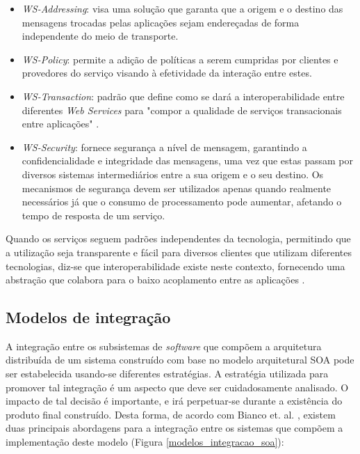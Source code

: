 \begin{itemize}
\item \textit{WS-Addressing}: visa uma solução que garanta que a origem e o destino das mensagens trocadas pelas aplicações sejam endereçadas de forma independente do meio de transporte.
\item \textit{WS-Policy}: permite a adição de políticas a serem cumpridas por clientes e provedores do serviço visando à efetividade da interação entre estes.
\item \textit{WS-Transaction}: padrão que define como se dará a interoperabilidade entre diferentes \textit{Web Services} para "compor a qualidade de serviços transacionais entre aplicações" \cite{oliveira_interoperabilidade}.
\item \textit{WS-Security}: fornece segurança a nível de mensagem, garantindo a confidencialidade e integridade das mensagens, uma vez que estas passam por diversos sistemas intermediários entre a sua origem e o seu destino. Os mecanismos de segurança devem ser utilizados apenas quando realmente necessários já que o consumo de processamento pode aumentar, afetando o tempo de resposta de um serviço.
\end{itemize}

Quando os serviços seguem padrões independentes da tecnologia, permitindo que a utilização seja transparente e fácil para diversos clientes que utilizam diferentes tecnologias, diz-se que interoperabilidade existe neste contexto, fornecendo uma abstração que colabora para o baixo acoplamento entre as aplicações \cite{oliveira_interoperabilidade}.

\subsection{Modelos de integração}
A integração entre os subsistemas de \textit{software} que compõem a arquitetura distribuída de um sistema construído com base no modelo arquitetural SOA pode ser estabelecida usando-se diferentes estratégias. A estratégia utilizada para promover tal integração é um aspecto que deve ser cuidadosamente analisado. O impacto de tal decisão é importante, e irá perpetuar-se durante a existência do produto final construído. Desta forma, de acordo com Bianco et. al. \cite{Bianco2007}, existem duas principais abordagens para a integração entre os sistemas que compõem a implementação deste modelo (Figura \ref{modelos_integracao_soa}):

